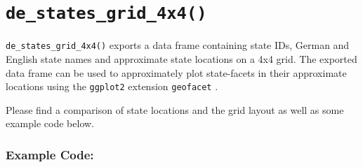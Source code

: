 \documentclass[
]{scrartcl}
\begin{document}
\newpage

\hypertarget{de_states_grid_4x4}{%
\section{\texorpdfstring{\texttt{de\_states\_grid\_4x4()}}{de\_states\_grid\_4x4()}}\label{de_states_grid_4x4}}

\texttt{de\_states\_grid\_4x4()} exports a data frame containing state
IDs, German and English state names and approximate state locations on a
4x4 grid. The exported data frame can be used to approximately plot
state-facets in their approximate locations using the \texttt{ggplot2}
extension \texttt{geofacet} \autocite{hafenGeofacetGgplot2Faceting2020}.

Please find a comparison of state locations and the grid layout as well
as some example code below.

\hypertarget{example-code-1}{%
\subsubsection{Example Code:}\label{example-code-1}}
\end{document}
